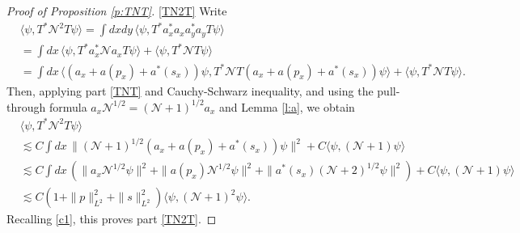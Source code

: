 \documentclass[11pt,a4paper,DIV11]{scrartcl}	%
\newcommand{\N}{\mathcal{N}}
\newcommand{\K}{\mathcal{K}}
\renewcommand{\Re}{\operatorname{Re}\,} 	%
\begin{document}
\begin{proof}[Proof of Proposition \ref{p:TNT}]
  \eqref{TN2T} Write
  \begin{align*}
    & \langle \psi, T^* \N^2 T \psi \rangle = \int dxdy \, \langle \psi, T^* a_x^* a_x a_y^* a_y T \psi \rangle \\
    & = \int dx \, \langle \psi, T^* a_x^* \N a_x T \psi \rangle + \langle
    \psi, T^* \N T \psi \rangle \\
    & = \int dx \, \langle (a_x + a(p_x) + a^*(s_x)) \psi, T^* \N T (a_x +
    a(p_x) + a^*(s_x)) \psi \rangle + \langle \psi, T^* \N T \psi \rangle.
  \end{align*}
  Then, applying part \eqref{TNT} and Cauchy-Schwarz inequality, and using the
  pull-through formula $a_x \N^{1/2} = (\N+1)^{1/2} a_x$ and Lemma \ref{l:a},
  we obtain
  \begin{align*}
    & \langle \psi, T^* \N^2 T \psi \rangle \\
    & \apprle C \int dx \, \| (\N+1)^{1/2} (a_x + a(p_x) +
    a^*(s_x)) \psi \|^2 + C \langle \psi, (\N+1) \psi \rangle \\
    & \apprle C \int dx \, (\| a_x \N^{1/2} \psi \|^2 + \| a(p_x)
    \N^{1/2} \psi \|^2 + \| a^*(s_x) (\N+2)^{1/2} \psi \|^2 ) + C \langle
    \psi, (\N+1) \psi \rangle \\
    & \apprle C(1 + \| p \|_{L^2}^2 + \| s \|_{L^2}^2) \langle \psi, (\N+1)^2
    \psi \rangle.
  \end{align*}
  Recalling \eqref{c1}, this proves part \eqref{TN2T}.
\iffalse
  \eqref{fKf} By Cauchy-Schwarz inequality, a brief calculation, and Lemma
  \ref{l:a},
  \begin{align*}
    \langle \psi, \phi(\varphi) \K \phi(\varphi) \psi \rangle & = \| \K^{1/2}
    (a^*(\varphi) + a(\varphi) ) \psi \|^2 \\
    & \apprle \langle \psi, a(\varphi) \K a^*(\varphi) \psi \rangle + \langle
    \psi, a^*(\varphi) \K a(\varphi) \psi \rangle \\
    & = \int dx \, \| a^*(\varphi) \nabla_x a_x \psi \|^2 + \int dx \, \|
    a(\varphi) \nabla_x a_x \psi \|^2 + \int dx \, |\nabla \varphi(x)|^2 \\
    & \quad - 2 \Re \int dx dy \, \langle \nabla \varphi(x) a_y \psi, f(y)
    \nabla_x a_x \psi \rangle \\
    & \apprle \| \varphi \|_{L^2}^2 \int dx \, \| (\N + 1)^{1/2} \nabla_x a_x
    \psi \|^2 + \int dx \, | \nabla \varphi(x) |^2 \\
    & \quad + \int dx dy \, | \nabla \varphi(x)|^2 \| a_y \psi \|^2 + \int dx
    dy \, |f(y)|^2 \| \nabla_x a_x \psi \|^2 \\
    & = \| \varphi \|_{L^2}^2 \langle \psi, \K (\N + 1) \psi \rangle + \|
    \nabla \varphi \|_{L^2}^2 \langle \psi, (\N + 1) \psi \rangle.
  \end{align*}
  This proves part \eqref{fKf} and completes the proof of the proposition.\fi
\end{proof}
\end{document}
